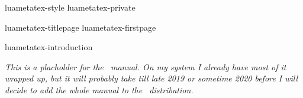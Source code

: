 
\environment luametatex-style
\environment luametatex-private

\startdocument
  [manual=LuaMeta\TeX,
   status=experimental,
   version=2.00]

\component luametatex-titlepage
\component luametatex-firstpage

\startfrontmatter
    \component luametatex-introduction
\stopfrontmatter

\startbodymatter

    \startparagraph \em
        This is a placholder for the \LUAMETATEX\ manual. On my system I already
        have most of it wrapped up, but it will probably take till late 2019 or
        sometime 2020 before I will decide to add the whole manual to the
        \CONTEXT\ distribution.
    \stopparagraph


\stopbodymatter

\startbackmatter
\stopbackmatter

\stopdocument
